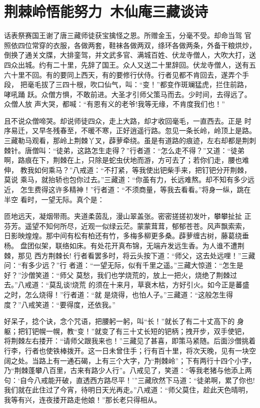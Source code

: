 \chapter{荆棘岭悟能努力~木仙庵三藏谈诗}

话表祭赛国王谢了唐三藏师徒获宝擒怪之恩。所赠金玉，分毫不受。却命当驾
官照依四位常穿的衣服，各做两套，鞋袜各做两双，绦环各做两条，外备干粮烘炒，
倒换了通关文牒，大排銮驾，并文武多官、满城百姓、伏龙寺僧人，大吹大打，送
四众出城。约有二十里，先辞了国王。众人又送二十里辞回。伏龙寺僧人，送有五
六十里不回。有的要同上西天，有的要修行伏侍。行者见都不肯回去，遂弄个手段，
把毫毛拔了三四十根，吹口仙气，叫：“变！”都变作斑斓猛虎，拦住前路，哮吼踊
跃。众僧方惧，不敢前进。大圣才引师父策马而去。少时间，去得远了。众僧人放
声大哭，都喊：“有恩有义的老爷!我等无缘，不肯度我们也！”

且不说众僧啼哭。却说师徒四众，走上大路，却才收回毫毛，一直西去。正是
时序易迁，又早冬残春至，不暖不寒，正好逍遥行路。忽见一条长岭，岭顶上是路。
三藏勒马观看，那岭上荆棘丫叉，薜萝牵绕。虽是有道路的痕迹，左右却都是荆刺
棘针。唐僧叫：“徒弟，这路怎生走得？”行者道：“怎么走不得？”又道：“徒弟
啊，路痕在下，荆棘在上，只除是蛇虫伏地而游，方可去了；若你们走，腰也难伸，
教我如何乘马？”八戒道：“不打紧，等我使出钯柴手来，把钉钯分开荆棘，莫说
乘马，就抬轿也包你过去。”三藏道：“你虽有力，长远难熬。却不知有多少远近，
怎生费得这许多精神！”行者道：“不须商量，等我去看看。”将身一纵，跳在半空
看时，一望无际。真个是：

匝地远天，凝烟带雨。夹道柔茵乱，漫山翠盖张。密密搓搓初发叶，攀攀扯扯
正芬芳。遥望不知何所尽，近观一似绿云茫。蒙蒙茸茸，郁郁苍苍。风声飘索索，
日影映煌煌。那中间有松有柏还有竹，多梅多柳更多桑。薜萝缠古树，藤葛绕垂杨。
盘团似架，联络如床。有处花开真布锦，无端卉发远生香。为人谁不遭荆棘，那见
西方荆棘长!
行者看罢多时，将云头按下道：“师父，这去处远哩！”三藏问：“有多少远？”行
者道：“一望无际，似有千里之遥。”三藏大惊道：“怎生是好？”沙僧笑道：“师父
莫愁，我们也学烧荒的，放上一把火，烧绝了荆棘过去。”八戒道：“莫乱谈!烧荒
的须在十来月，草衰木枯，方好引火。如今正是蕃盛之时，怎么烧得！”行者道：“就
是烧得，也怕人子。”三藏道：“这般怎生得度？”八戒笑道：“要得度，还依我。”

好呆子，捻个诀，念个咒语，把腰躬一躬，叫“长！”就长了有二十丈高下的
身躯；把钉钯幌一幌，教“变！”就变了有三十丈长短的钯柄；拽开步，双手使钯，
将荆棘左右搂开：“请师父跟我来也！”三藏见了甚喜，即策马紧随。后面沙僧挑着
行李，行者也使铁棒拨开。这一日未曾住手；行有百十里，将次天晚，见有一块空
阔之处。当路上有一通石碣，上有三个大字，乃“荆棘岭”；下有两行十四个小字，
乃“荆棘蓬攀八百里，古来有路少人行”。八戒见了，笑道：“等我老猪与他添上两
句：‘自今八戒能开破，直透西方路尽平！’”三藏欣然下马道：“徒弟啊，累了你也!
我们就在此住过了今宵，待明日天光再走。”八戒道：“师父莫住，趁此天色晴明，
我等有兴，连夜搂开路走他娘！”那长老只得相从。

